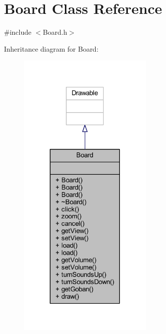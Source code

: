 \hypertarget{class_board}{}\section{Board Class Reference}
\label{class_board}


{\ttfamily \#include $<$Board.\+h$>$}



Inheritance diagram for Board\+:
\nopagebreak
\begin{figure}[H]
\begin{center}
\leavevmode
\includegraphics[width=185pt]{class_board__inherit__graph}
\end{center}
\end{figure}


